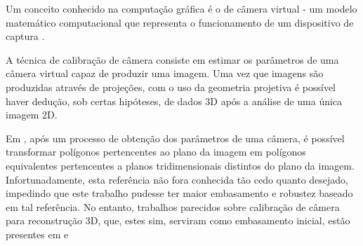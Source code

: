 		Um conceito conhecido na computação gráfica é o de câmera virtual - um modelo matemático computacional que representa o funcionamento de um dispositivo de captura \cite{fundCompGraf}. 
		
		A técnica de calibração de câmera consiste em estimar os parâmetros de uma câmera virtual capaz de produzir uma imagem. Uma vez que imagens são produzidas através de projeções, com o uso da geometria projetiva é possível haver dedução, sob certas hipóteses, de dados 3D após a análise de uma única imagem 2D.
		
		Em \cite{3DFromLineDrawings}, após um processo de obtenção dos parâmetros de uma câmera, é possível transformar polígonos pertencentes ao plano da imagem em polígonos equivalentes pertencentes a planos tridimensionais distintos do plano da imagem. Infortunadamente, esta referência não fora conhecida tão cedo quanto desejado, impedindo que este trabalho pudesse ter maior embasamento e robustez baseado em tal referência. No entanto, trabalhos parecidos sobre calibração de câmera para reconstrução 3D, que, estes sim, serviram como embasamento inicial, estão presentes em \cite{juizVirtual} e \cite{szenbergDoutorado}